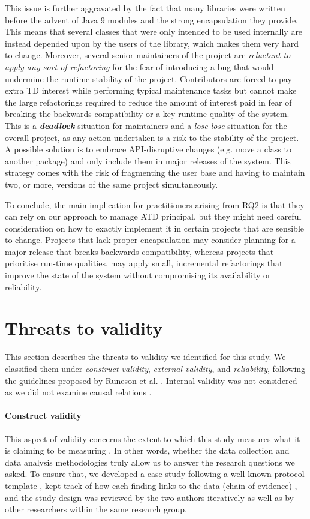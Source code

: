 This issue is further aggravated by the fact that many libraries were written before the advent of Java 9 modules and the strong encapsulation they provide. This means that several classes that were only intended to be used internally are instead depended upon by the users of the library, which makes them very hard to change.
Moreover, several senior maintainers of the project are \emph{reluctant to apply any sort of refactoring} for the fear of introducing a bug that would undermine the runtime stability of the project.
Contributors are forced to pay extra TD interest while performing typical maintenance tasks but cannot make the large refactorings required to reduce the amount of interest paid in fear of breaking the backwards compatibility or a key runtime quality of the system. 
This is a \textbf{\emph{deadlock}} situation for maintainers and a \emph{lose-lose} situation for the overall project, as any action undertaken is a risk to the stability of the project.
A possible solution is to embrace API-disruptive changes (e.g. move a class to another package) and only include them in major releases of the system.
This strategy comes with the risk of fragmenting the user base and having to maintain two, or more, versions of the same project simultaneously.
 
To conclude, the main implication for practitioners arising from RQ2 is that they can rely on our approach to manage ATD principal, but they might need careful consideration on how to exactly implement it in certain projects that are sensible to change.
Projects that lack proper encapsulation may consider planning for a major release that breaks backwards compatibility, whereas projects that prioritise run-time qualities, may apply small, incremental refactorings that improve the state of the system without compromising its availability or reliability.


\section{Threats to validity}\label{c6:sec:threats-to-validity}
This section describes the threats to validity we identified for this study.
We classified them under \emph{construct validity}, \emph{external validity}, and \emph{reliability}, following the guidelines proposed by Runeson et al. \cite{Runeson2012}.
Internal validity was not considered as we did not examine causal relations \cite{Runeson2012}.

\paragraph*{Construct validity}
This aspect of validity concerns the extent to which this study measures what it is claiming to be measuring \cite{Runeson2012}. 
In other words, whether the data collection and data analysis methodologies truly allow us to answer the research questions we asked.
To ensure that, we developed a case study following a well-known protocol template \cite{Brereton2008}, kept track of how each finding links to the data (chain of evidence) \cite{Runeson2012}, and the study design was reviewed by the two authors iteratively as well as by other researchers within the same research group.

